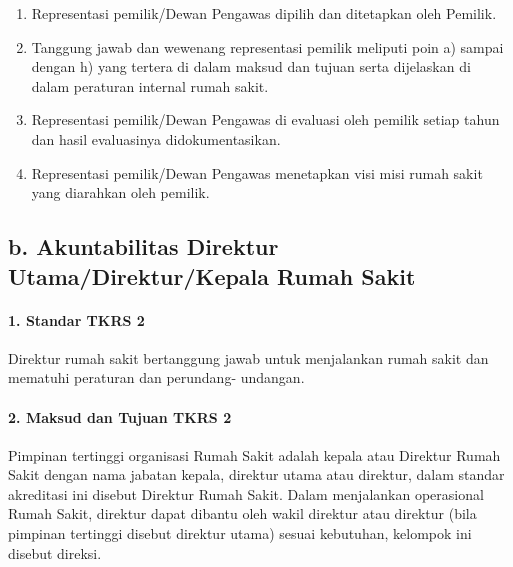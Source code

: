\documentclass[
]{book}
\providecommand{\tightlist}{%
  \setlength{\itemsep}{0pt}\setlength{\parskip}{0pt}}
\begin{document}
\begin{enumerate}
\def\labelenumi{\alph{enumi}.}
\tightlist
\item
  Representasi pemilik/Dewan Pengawas dipilih dan ditetapkan oleh Pemilik.
\item
  Tanggung jawab dan wewenang representasi pemilik meliputi poin a) sampai dengan h) yang tertera di dalam maksud dan tujuan serta dijelaskan di dalam peraturan internal rumah sakit.
\item
  Representasi pemilik/Dewan Pengawas di evaluasi oleh pemilik setiap tahun dan hasil evaluasinya didokumentasikan.
\item
  Representasi pemilik/Dewan Pengawas menetapkan visi misi rumah sakit yang diarahkan oleh pemilik.
\end{enumerate}

\hypertarget{b.-akuntabilitas-direktur-utamadirekturkepala-rumah-sakit}{%
\subsection*{b. Akuntabilitas Direktur Utama/Direktur/Kepala Rumah Sakit}\label{b.-akuntabilitas-direktur-utamadirekturkepala-rumah-sakit}}

\hypertarget{standar-tkrs-2}{%
\paragraph*{1. Standar TKRS 2}\label{standar-tkrs-2}}

Direktur rumah sakit bertanggung jawab untuk menjalankan rumah sakit dan mematuhi peraturan dan perundang- undangan.

\hypertarget{maksud-dan-tujuan-tkrs-2}{%
\paragraph*{2. Maksud dan Tujuan TKRS 2}\label{maksud-dan-tujuan-tkrs-2}}

Pimpinan tertinggi organisasi Rumah Sakit adalah kepala atau Direktur Rumah Sakit dengan nama jabatan kepala, direktur utama atau direktur, dalam standar akreditasi ini disebut Direktur Rumah Sakit. Dalam menjalankan operasional Rumah Sakit, direktur dapat dibantu oleh wakil direktur atau direktur (bila pimpinan tertinggi disebut direktur utama) sesuai kebutuhan, kelompok ini disebut direksi.
\end{document}
